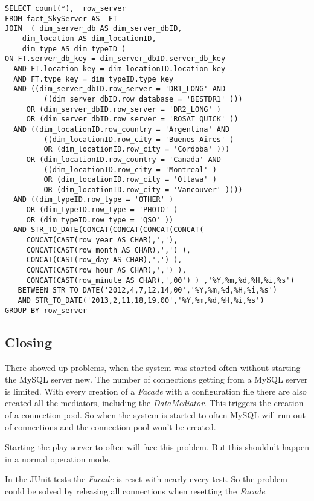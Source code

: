 \begin{lstlisting}
SELECT count(*),  row_server 
FROM fact_SkyServer AS  FT  
JOIN  ( dim_server_db AS dim_server_dbID,  
	dim_location AS dim_locationID,  
	dim_type AS dim_typeID )
ON FT.server_db_key = dim_server_dbID.server_db_key
  AND FT.location_key = dim_locationID.location_key
  AND FT.type_key = dim_typeID.type_key
  AND ((dim_server_dbID.row_server = 'DR1_LONG' AND
         ((dim_server_dbID.row_database = 'BESTDR1' ))) 
     OR (dim_server_dbID.row_server = 'DR2_LONG' )
     OR (dim_server_dbID.row_server = 'ROSAT_QUICK' ))
  AND ((dim_locationID.row_country = 'Argentina' AND
         ((dim_locationID.row_city = 'Buenos Aires' )
         OR (dim_locationID.row_city = 'Cordoba' )))   
     OR (dim_locationID.row_country = 'Canada' AND
         ((dim_locationID.row_city = 'Montreal' )
         OR (dim_locationID.row_city = 'Ottawa' )
         OR (dim_locationID.row_city = 'Vancouver' ))))  
  AND ((dim_typeID.row_type = 'OTHER' )  
     OR (dim_typeID.row_type = 'PHOTO' )  
     OR (dim_typeID.row_type = 'QSO' ))  
  AND STR_TO_DATE(CONCAT(CONCAT(CONCAT(CONCAT(
     CONCAT(CAST(row_year AS CHAR),','),
     CONCAT(CAST(row_month AS CHAR),',') ),
     CONCAT(CAST(row_day AS CHAR),',') ),
     CONCAT(CAST(row_hour AS CHAR),',') ),
     CONCAT(CAST(row_minute AS CHAR),',00') ) ,'%Y,%m,%d,%H,%i,%s')  
   BETWEEN STR_TO_DATE('2012,4,7,12,14,00','%Y,%m,%d,%H,%i,%s')  
   AND STR_TO_DATE('2013,2,11,18,19,00','%Y,%m,%d,%H,%i,%s')
GROUP BY row_server
\end{lstlisting}


\subsection{Closing}
There showed up problems, when the system was started often without starting the MySQL server new.
The number of connections getting from a MySQL server is limited. With every creation of a \textit{Facade}
with a configuration file there are also created all the mediators, including the \textit{DataMediator}.
This triggers the creation of a connection pool. So when the system is started to often
MySQL will run out of connections and the connection pool won't be created.

Starting the play server to often will face this problem. But this shouldn't happen in a normal
operation mode.

In the JUnit tests the \textit{Facade} is reset with nearly every test. So the problem could be
solved by releasing all connections when resetting the \textit{Facade}. 

